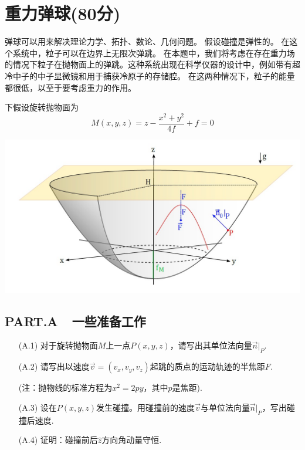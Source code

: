 \documentclass{article}
\begin{document}
\section*{重力弹球(80分)}
弹球可以用来解决理论力学、拓扑、数论、几何问题。 假设碰撞是弹性的。  在这个系统中，粒子可以在边界上无限次弹跳。 在本题中，我们将考虑在存在重力场的情况下粒子在抛物面上的弹跳。这种系统出现在科学仪器的设计中，例如带有超冷中子的中子显微镜和用于捕获冷原子的存储腔。 在这两种情况下，粒子的能量都很低，以至于要考虑重力的作用。 \par
下假设旋转抛物面为
\[
M(x,y,z)=z-\dfrac{x^2+y^2}{4f}+f=0
\]
    \begin{center}
    \includegraphics[scale=0.4]{img/1.jpg}\par
    \end{center}

\subsection*{PART.A\ \ 一些准备工作}
\begin{itemize}
    \item[(A.1)]对于旋转抛物面$M$上一点$P(x,y,z)$，请写出其单位法向量$\vec{n}|_P$.
    \item[(A.2)]请写出以速度$\vec{v}=(v_x,v_y,v_z)$起跳的质点的运动轨迹的半焦距$F$.\par (注：抛物线的标准方程为$x^2=2py$，其中$p$是焦距). 
    \item[(A.3)]设在$P(x,y,z)$发生碰撞。用碰撞前的速度$\vec{v}$与单位法向量$\vec{n}|_P$，写出碰撞后速度.
    \item[(A.4)]证明：碰撞前后$\hat{z}$方向角动量守恒. 
\end{itemize}
\end{document}
